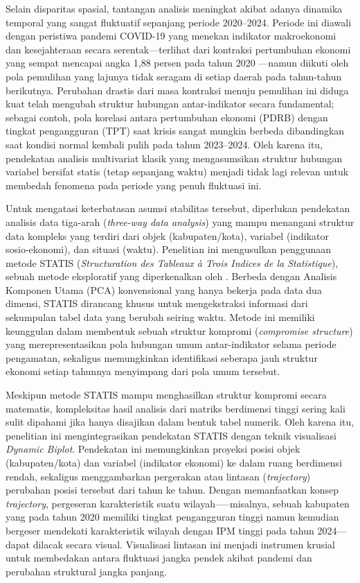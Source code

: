 \documentclass[a4paper]{article}
\theoremstyle{definition} %
\begin{document}
Selain disparitas spasial, tantangan analisis meningkat akibat adanya dinamika temporal yang sangat fluktuatif sepanjang periode 2020--2024. Periode ini diawali dengan peristiwa pandemi COVID-19 yang menekan indikator makroekonomi dan kesejahteraan secara serentak—terlihat dari kontraksi pertumbuhan ekonomi yang sempat mencapai angka 1,88 persen pada tahun 2020 \citep{bpspdrb}—namun diikuti oleh pola pemulihan yang lajunya tidak seragam di setiap daerah pada tahun-tahun berikutnya. Perubahan drastis dari masa kontraksi menuju pemulihan ini diduga kuat telah mengubah struktur hubungan antar-indikator secara fundamental; sebagai contoh, pola korelasi antara pertumbuhan ekonomi (PDRB) dengan tingkat pengangguran (TPT) saat krisis sangat mungkin berbeda dibandingkan saat kondisi normal kembali pulih pada tahun 2023--2024. Oleh karena itu, pendekatan analisis multivariat klasik yang mengasumsikan struktur hubungan variabel bersifat statis (tetap sepanjang waktu) menjadi tidak lagi relevan untuk membedah fenomena pada periode yang penuh fluktuasi ini.

Untuk mengatasi keterbatasan asumsi stabilitas tersebut, diperlukan pendekatan analisis data tiga-arah (\textit{three-way data analysis}) yang mampu menangani struktur data kompleks yang terdiri dari objek (kabupaten/kota), variabel (indikator sosio-ekonomi), dan situasi (waktu). Penelitian ini mengusulkan penggunaan metode STATIS (\textit{Structuration des Tableaux à Trois Indices de la Statistique}), sebuah metode eksploratif yang diperkenalkan oleh \citep{lavit94,oliveira2024}. Berbeda dengan Analisis Komponen Utama (PCA) konvensional yang hanya bekerja pada data dua dimensi, STATIS dirancang khusus untuk mengekstraksi informasi dari sekumpulan tabel data yang berubah seiring waktu. Metode ini memiliki keunggulan dalam membentuk sebuah struktur kompromi (\textit{compromise structure}) yang merepresentasikan pola hubungan umum antar-indikator selama periode pengamatan, sekaligus memungkinkan identifikasi seberapa jauh struktur ekonomi setiap tahunnya menyimpang dari pola umum tersebut.

Meskipun metode STATIS mampu menghasilkan struktur kompromi secara matematis, kompleksitas hasil analisis dari matriks berdimensi tinggi sering kali sulit dipahami jika hanya disajikan dalam bentuk tabel numerik. Oleh karena itu, penelitian ini mengintegrasikan pendekatan STATIS dengan teknik visualisasi \textit{Dynamic Biplot}. Pendekatan ini memungkinkan proyeksi posisi objek (kabupaten/kota) dan variabel (indikator ekonomi) ke dalam ruang berdimensi rendah, sekaligus menggambarkan pergerakan atau lintasan (\textit{trajectory}) perubahan posisi tersebut dari tahun ke tahun. Dengan memanfaatkan konsep \textit{trajectory}, pergeseran karakteristik suatu wilayah—--misalnya, sebuah kabupaten yang pada tahun 2020 memiliki tingkat pengangguran tinggi namun kemudian bergeser mendekati karakteristik wilayah dengan IPM tinggi pada tahun 2024---dapat dilacak secara visual. Visualisasi lintasan ini menjadi instrumen krusial untuk membedakan antara fluktuasi jangka pendek akibat pandemi dan perubahan struktural jangka panjang.
\end{document}
